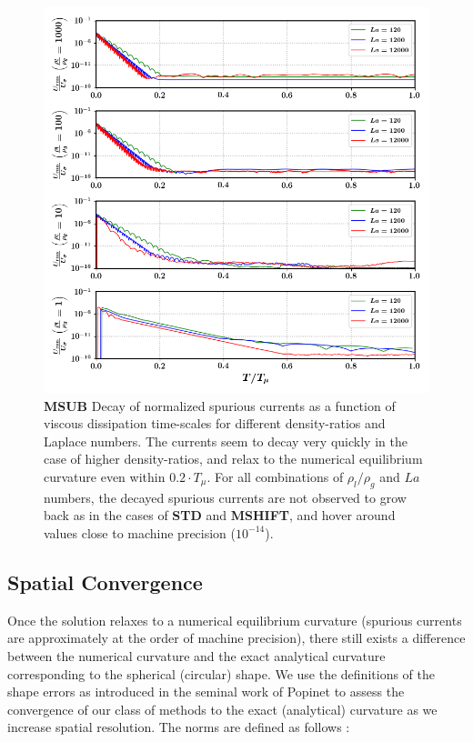 \begin{figure}[h!]
    \centering
    \includegraphics[]{plots/static_drop/decay_sagar.png}
	\caption{\textbf{MSUB} Decay of normalized spurious currents as a function of viscous dissipation time-scales for different density-ratios and Laplace numbers. The currents seem to decay very quickly in the case of higher density-ratios, and relax to the numerical equilibrium curvature even within $0.2 \cdot T_\mu$. For all combinations of $\rho_l / \rho_g$ and $La$ numbers, the decayed spurious currents are not observed to grow back as in the cases of \textbf{STD} and \textbf{MSHIFT}, and hover around values close to machine precision ($10^{-14}$).}   
    \label{decay_sagar}
\end{figure}



\subsection*{Spatial Convergence}

Once the solution relaxes to a numerical equilibrium curvature (spurious currents are approximately at the order of machine precision), there still exists a difference between the numerical curvature and the exact analytical curvature corresponding to the spherical (circular) shape. We use the definitions of the shape errors as introduced in the seminal work of Popinet \cite{popinet2009accurate} to assess the convergence of our class of methods to the exact (analytical) curvature as we increase spatial resolution. The norms are defined as follows :      


